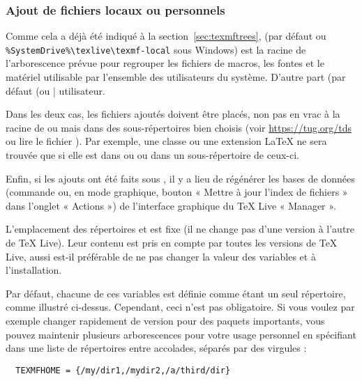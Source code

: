 \documentclass[german, english, french, 12pt]{article}
\renewcommand{\TL}{\TeX{} Live\xspace}%
\begin{document}
\subsubsection{Ajout de fichiers locaux ou personnels}
\label{sec:local-personal-macros}

Comme cela a déjà été indiqué à la section~\ref{sec:texmftrees},
 (par défaut  ou
\verb|%SystemDrive%\texlive\texmf-local| sous Windows) est la racine de
l'arborescence prévue pour regrouper les fichiers de macros, les fontes et le
matériel utilisable par l'ensemble des utilisateurs du système.  D'autre part
 (par défaut  %
(ou |%
utilisateur.

Dans les deux cas, les fichiers ajoutés doivent être placés, non pas en vrac
à la racine de  ou  mais dans des
sous-répertoires bien choisis (voir \url{https://tug.org/tds} ou lire le fichier
). Par exemple, une classe ou une extension \LaTeX{} ne sera
trouvée que si elle est dans  ou
 ou dans un sous-répertoire de ceux-ci.

Enfin, si les ajouts ont été faits sous , il y a lieu de
régénérer les bases de données  (commande  ou,
en mode graphique, bouton « Mettre à jour l'index de fichiers » dans l'onglet
« Actions ») de l'interface graphique du \TL{} « Manager ».

L'emplacement des répertoires  et  est
fixe (il ne change pas d'une version à l'autre de \TL{}). Leur contenu est pris
en compte par toutes les versions de \TL{}, aussi est-il préférable de ne pas
changer la valeur des variables  et 
à l'installation.

Par défaut, chacune de ces variables est définie comme étant un seul répertoire,
comme illustré ci-dessus. Cependant, ceci n'est pas obligatoire.  Si vous voulez
par exemple changer rapidement de version pour des paquets importants, vous
pouvez maintenir plusieurs arborescences pour votre usage personnel en
spécifiant dans  une liste de répertoires entre accolades,
séparés par des virgules :

\begin{verbatim}
  TEXMFHOME = {/my/dir1,/mydir2,/a/third/dir}
\end{verbatim}
\end{document}
